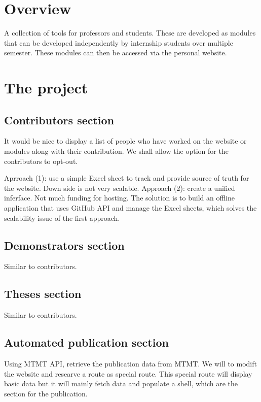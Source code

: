 \documentclass{article}
\begin{document}
\section{Overview}

A collection of tools for professors and students. These are developed as modules that can be developed independently by internship students over multiple semester. These modules can then be accessed via the personal website.

\section{The project}

\subsection{Contributors section}

It would be nice to display a list of people who have worked on the website or modules along with their contribution. We shall allow the option for the contributors to opt-out.

Aprroach (1): use a simple Excel sheet to track and provide source of truth for the website. Down side is not very scalable. Approach (2): create a unified inferface. Not much funding for hosting. The solution is to build an offline application that uses GitHub API and manage the Excel sheets, which solves the scalability issue of the first approach.

\subsection{Demonstrators section}

Similar to contributors.

\subsection{Theses section}

Similar to contributors.

\subsection{Automated publication section}

Using MTMT API, retrieve the publication data from MTMT. We will to modift the website and researve a route as special route. This special route will display basic data but it will mainly fetch data and populate a shell, which are the section for the publication.
\end{document}
